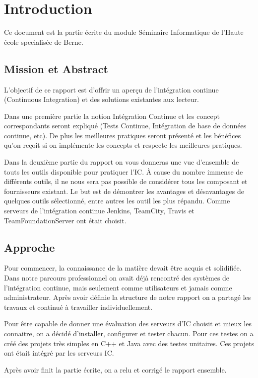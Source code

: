 \chapter{Introduction}
\label{chap:introduction}
Ce document est la partie écrite du module Séminaire Informatique de l'Haute école specialisée de Berne.

\section{Mission et Abstract}
\label{sec:intro_mission}
L'objectif de ce rapport est d'offrir un aperçu de l'intégration continue (Continuous Integration) et des solutions existantes aux lecteur.

Dans une première partie la notion Intégration Continue et les concept correspondants seront expliqué (Tests Continue, Intégration de base de données continue, etc). De plus les meilleures pratiques seront présenté et les bénéfices qu'on reçoit si on implémente les concepts et respecte les meilleures pratiques.

Dans la deuxième partie du rapport on vous donneras une vue d'ensemble de touts les outils disponible pour pratiquer l'IC. À cause du nombre immense de différents outils, il ne nous sera pas possible de considérer tous les composant et fournisseurs existant. Le but est de démontrer les avantages et désavantages de quelques outils sélectionné, entre autres les outil les plus répandu. Comme serveurs de l'intégration continue Jenkins, TeamCity, Travis et TeamFoundationServer ont était choisit.

\section{Approche}
\label{sec:intro_approche}

Pour commencer, la connaissance de la matière devait être acquis et solidifiée. Dans notre parcours professionnel on avait déjà rencontré des systèmes de l'intégration continue, mais seulement comme utilisateurs et jamais comme administrateur. Après avoir définie la structure de notre rapport on a partagé les travaux et continué à travailler individuellement. 

Pour être capable de donner une évaluation des serveurs d'IC choisit et mieux les connaitre, on a décidé d'installer, configurer et tester chacun. Pour ces testes on a créé des projets très simples en C++ et Java avec des testes unitaires. Ces projets ont était intégré par les serveurs IC.

Après avoir finit la partie écrite, on a relu et corrigé le rapport ensemble.


